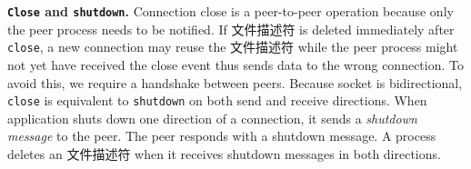 
\textbf{\texttt{Close} and \texttt{shutdown}.}
Connection close is a peer-to-peer operation because only the peer process needs to be notified. If 文件描述符 is deleted immediately after \texttt{close}, a new connection may reuse the 文件描述符 while the peer process might not yet have received the close event thus sends data to the wrong connection. To avoid this, we require a handshake between peers.
Because socket is bidirectional, \texttt{close} is equivalent to \texttt{shutdown} on both send and receive directions.
When application shuts down one direction of a connection, it sends a \textit{shutdown message} to the peer. The peer responds with a shutdown message. A process deletes an 文件描述符 when it receives shutdown messages in both directions.



\fi
